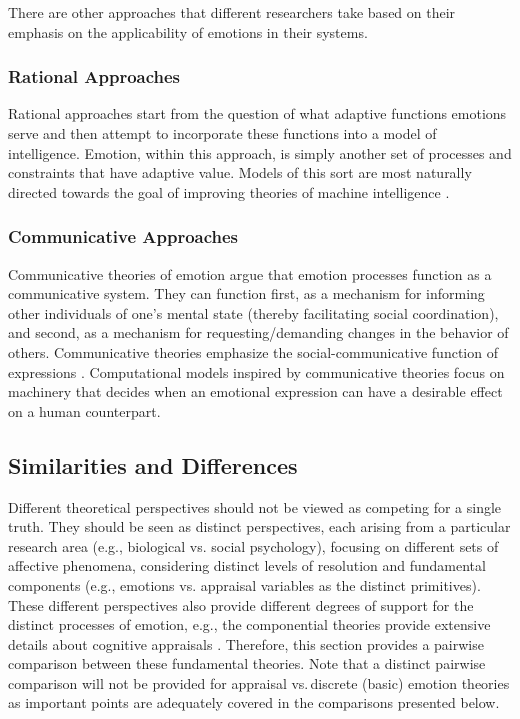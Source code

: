 \documentclass[12pt]{report}
\begin{document}

There are other approaches that different researchers take based on their
emphasis on the applicability of emotions in their systems.

\subsubsection{Rational Approaches}

Rational approaches start from the question of what adaptive functions emotions
serve and then attempt to incorporate these functions into a model of
intelligence. Emotion, within this approach, is simply another set of processes
and constraints that have adaptive value. Models of this sort are most naturally
directed towards the goal of improving theories of machine intelligence
\cite{anderson:newell-cognition} \cite{scheutz:affect-agent}
\cite{simon:motivation-emotion-cognition}.

\subsubsection{Communicative Approaches}

Communicative theories of emotion argue that emotion processes function as a
communicative system. They can function first, as a mechanism for informing
other individuals of one's mental state (thereby facilitating social
coordination), and second, as a mechanism for requesting/demanding changes in
the behavior of others. Communicative theories emphasize the
social-communicative function of expressions \cite{gratch:emotion-intention}.
Computational models inspired by communicative theories focus on machinery that
decides when an emotional expression can have a desirable effect on a human
counterpart.

\subsection{Similarities and Differences}
\label{sec:comparison}

Different theoretical perspectives should not be viewed as competing for a
single truth. They should be seen as distinct perspectives, each arising from a
particular research area (e.g., biological vs. social psychology), focusing on
different sets of affective phenomena, considering distinct levels of resolution
and fundamental components (e.g., emotions vs. appraisal variables as the
distinct primitives). These different perspectives also provide different
degrees of support for the distinct processes of emotion, e.g., the componential
theories provide extensive details about cognitive appraisals
\cite{hudlicka:guidelines-emotions}. Therefore, this section provides a pairwise
comparison between these fundamental theories. Note that a distinct pairwise
comparison will not be provided for appraisal vs.\,discrete (basic) emotion
theories as important points are adequately covered in the comparisons presented
below.
\end{document}

